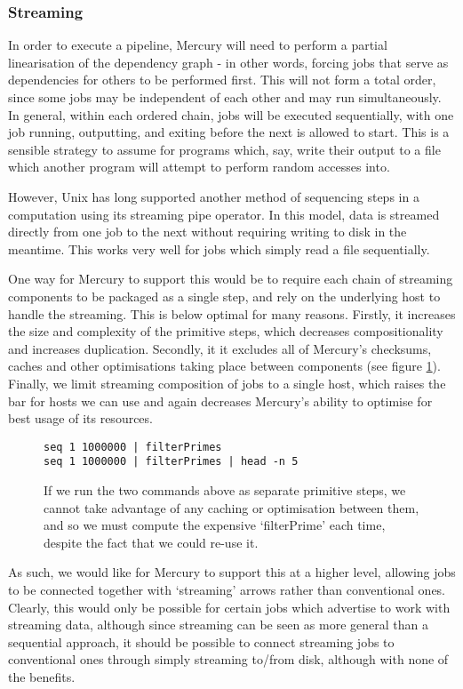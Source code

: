 \documentclass[10pt,a4paper]{article}
\newcommand{\npar}{\par\noindent\space}
\begin{document}
\subsubsection{Streaming}
\npar In order to execute a pipeline, Mercury will need to perform a partial linearisation of the dependency graph - in other words, forcing jobs that serve as dependencies for others to be performed first. This will not form a total order, since some jobs may be independent of each other and may run simultaneously. In general, within each ordered chain, jobs will be executed sequentially, with one job running, outputting, and exiting before the next is allowed to start. This is a sensible strategy to assume for programs which, say, write their output to a file which another program will attempt to perform random accesses into.
\npar However, Unix has long supported another method of sequencing steps in a computation using its streaming pipe operator. In this model, data is streamed directly from one job to the next without requiring writing to disk in the meantime. This works very well for jobs which simply read a file sequentially.
\npar One way for Mercury to support this would be to require each chain of streaming components to be packaged as a single step, and rely on the underlying host to handle the streaming. This is below optimal for many reasons. Firstly, it increases the size and complexity of the \glspl{primitive step}, which decreases compositionality and increases duplication. Secondly, it it excludes all of Mercury's checksums, caches and other optimisations taking place between components (see figure \ref{fig:streaming:bigPrimitives}). Finally, we limit streaming composition of jobs to a single host, which raises the bar for hosts we can use and again decreases Mercury's ability to optimise for best usage of its resources.
\begin{figure}
\lstset{language=Bash,
		xleftmargin=.2\textwidth,
		xrightmargin=.2\textwidth
		}
\begin{lstlisting}
seq 1 1000000 | filterPrimes
seq 1 1000000 | filterPrimes | head -n 5
\end{lstlisting}
\caption{If we run the two commands above as separate primitive steps, we cannot take advantage of any caching or optimisation between them, and so we must compute the expensive `filterPrime' each time, despite the fact that we could re-use it. }
\label{fig:streaming:bigPrimitives}
\end{figure}
\npar As such, we would like for Mercury to support this at a higher level, allowing jobs to be connected together with `streaming' arrows rather than conventional ones. Clearly, this would only be possible for certain jobs which advertise to work with streaming data, although since streaming can be seen as more general than a sequential approach, it should be possible to connect streaming jobs to conventional ones through simply streaming to/from disk, although with none of the benefits.
\end{document}

